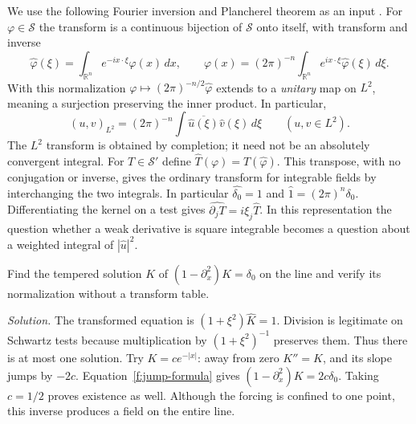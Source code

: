 We use the following Fourier inversion and Plancherel theorem as an input \cite[Ch.~VII, \S7.1]{HormI}. For $\varphi\in\mathcal S$ the transform is a continuous bijection of $\mathcal S$ onto itself, with transform and inverse
\begin{equation}
 \widehat\varphi(\xi)=\int_{\mathbb R^n} e^{-ix\cdot\xi}\varphi(x)\,dx,\qquad
 \varphi(x)=(2\pi)^{-n}\int_{\mathbb R^n}e^{ix\cdot\xi}\widehat\varphi(\xi)\,d\xi .\label{f:fourier-pair}
\end{equation}
With this normalization $\varphi\mapsto(2\pi)^{-n/2}\widehat\varphi$ extends to a \emph{unitary} map on $L^2$, meaning a surjection preserving the inner product. In particular,
\begin{equation}
 (u,v)_{L^2}=(2\pi)^{-n}\int\overline{\widehat u(\xi)}\widehat v(\xi)\,d\xi \qquad (u,v\in L^2).\label{f:plancherel}
\end{equation}
The $L^2$ transform is obtained by completion; it need not be an absolutely convergent integral. For $T\in\mathcal S'$ define $\widehat T(\varphi)=T(\widehat\varphi)$. This transpose, with no conjugation or inverse, gives the ordinary transform for integrable fields by interchanging the two integrals. In particular $\widehat{\delta_0}=1$ and $\widehat 1=(2\pi)^n\delta_0$. Differentiating the kernel on a test gives $\widehat{\partial_j T}=i\xi_j\widehat T$. In this representation the question whether a weak derivative is square integrable becomes a question about a weighted integral of $|\widehat u|^2$.

\begin{exercise}
Find the tempered solution $K$ of $(1-\partial_x^2)K=\delta_0$ on the line and verify its normalization without a transform table.
\end{exercise}
\noindent\emph{Solution.} The transformed equation is $(1+\xi^2)\widehat K=1$. Division is legitimate on Schwartz tests because multiplication by $(1+\xi^2)^{-1}$ preserves them. Thus there is at most one solution. Try $K=c e^{-|x|}$: away from zero $K''=K$, and its slope jumps by $-2c$. Equation~\eqref{f:jump-formula} gives $(1-\partial_x^2)K=2c\delta_0$. Taking $c=1/2$ proves existence as well. Although the forcing is confined to one point, this inverse produces a field on the entire line.
